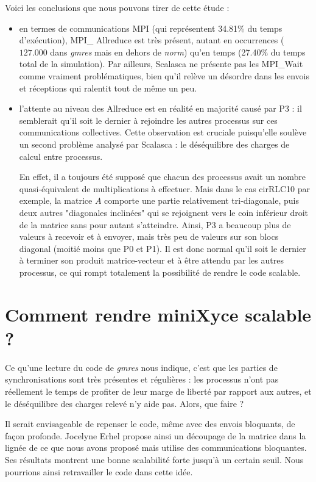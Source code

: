 \documentclass[11pt,a4paper,oneside]{memoir}
\theoremstyle{definition}
\theoremstyle{remark}
\theoremstyle{plain}
\begin{document}
Voici les conclusions que nous pouvons tirer de cette étude :
\begin{itemize}
\item en termes de communications MPI (qui représentent 34.81\% du temps d'exécution), MPI\_ Allreduce est très présent, autant en occurrences ($127.000$ dans \textit{gmres} mais en dehors de \textit{norm}) qu'en temps (27.40\% du temps total de la simulation). Par ailleurs, Scalasca ne présente pas les MPI\_Wait comme vraiment problématiques, bien qu'il relève un désordre dans les envois et réceptions qui ralentit tout de même un peu.
\item l'attente au niveau des Allreduce est en réalité en majorité causé par P3 : il semblerait qu'il soit le dernier à rejoindre les autres processus sur ces communications collectives. Cette observation est cruciale puisqu'elle soulève un second problème analysé par Scalasca : le déséquilibre des charges de calcul entre processus.

En effet, il a toujours été supposé que chacun des processus avait un nombre quasi-équivalent de multiplications à effectuer. Mais dans le cas cirRLC10 par exemple, la matrice $A$ comporte une partie relativement tri-diagonale, puis deux autres "diagonales inclinées" qui se rejoignent vers le coin inférieur droit de la matrice sans pour autant s'atteindre. Ainsi, P3 a beaucoup plus de valeurs à recevoir et à envoyer, mais très peu de valeurs sur son blocs diagonal (moitié moins que P0 et P1). Il est donc normal qu'il soit le dernier à terminer son produit matrice-vecteur et à être attendu par les autres processus, ce qui rompt totalement la possibilité de rendre le code scalable.
\end{itemize}


\section{Comment rendre miniXyce scalable ?}

Ce qu'une lecture du code de \textit{gmres} nous indique, c'est que les parties de synchronisations sont très présentes et régulières : les processus n'ont pas réellement le temps de profiter de leur marge de liberté par rapport aux autres, et le déséquilibre des charges relevé n'y aide pas. Alors, que faire ?\bigskip

Il serait envisageable de repenser le code, même avec des envois bloquants, de façon profonde. Jocelyne Erhel \cite{erhel95} propose ainsi un découpage de la matrice dans la lignée de ce que nous avons proposé mais utilise des communications bloquantes. Ses résultats montrent une bonne scalabilité forte jusqu'à un certain seuil. Nous pourrions ainsi retravailler le code dans cette idée.\medskip
\end{document}
